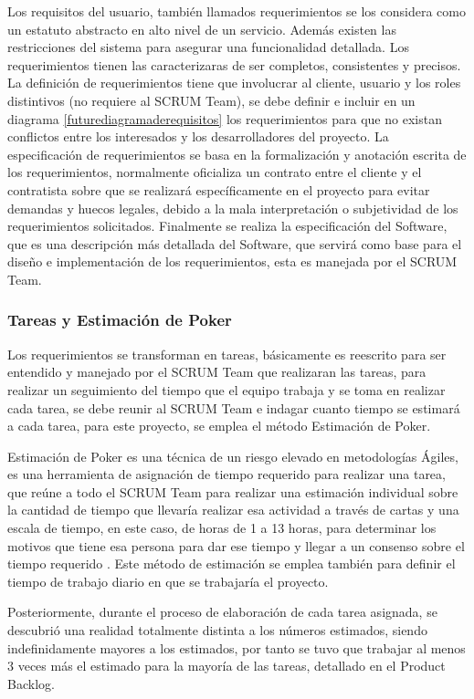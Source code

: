 Los requisitos del usuario, también llamados requerimientos se los considera como un estatuto abstracto en alto nivel de un servicio. Además existen las restricciones del sistema para asegurar una funcionalidad detallada. Los requerimientos tienen las caracterizaras de ser completos, consistentes y precisos. 
La definición de requerimientos tiene que involucrar al cliente, usuario y los roles distintivos (no requiere al SCRUM Team), se debe definir e incluir en un diagrama \ref{futurediagramaderequisitos} los requerimientos para que no existan conflictos entre los interesados y los desarrolladores del proyecto.
La especificación de requerimientos se basa en la formalización y anotación escrita de los requerimientos, normalmente oficializa un contrato entre el cliente y el contratista sobre que se realizará específicamente en el proyecto para evitar demandas y huecos legales, debido a la mala interpretación o subjetividad de los requerimientos solicitados.
Finalmente se realiza la especificación del Software, que es una descripción más detallada del Software, que servirá como base para el diseño e implementación de los requerimientos, esta es manejada por el SCRUM Team.

\subsubsection{Tareas y Estimación de Poker}

Los requerimientos se transforman en tareas, básicamente es reescrito para ser entendido y manejado por el SCRUM Team que realizaran las tareas, para realizar un seguimiento del tiempo que el equipo trabaja y se toma en realizar cada tarea, se debe reunir al SCRUM Team e indagar cuanto tiempo se estimará a cada tarea, para este proyecto, se emplea el método Estimación de Poker.

Estimación de Poker es una técnica de un riesgo elevado en metodologías Ágiles, es una herramienta de asignación de tiempo requerido para realizar una tarea, que reúne a todo el SCRUM Team para realizar una estimación individual sobre la cantidad de tiempo que llevaría realizar esa actividad a través de cartas y una escala de tiempo, en este caso, de horas de 1 a 13 horas, para determinar los motivos que tiene esa persona para dar ese tiempo y llegar a un consenso sobre el tiempo requerido \cite{scrumdiapo}. Este método de estimación se emplea también para definir el tiempo de trabajo diario en que se trabajaría el proyecto.

Posteriormente, durante el proceso de elaboración de cada tarea asignada, se descubrió una realidad totalmente distinta a los números estimados, siendo indefinidamente mayores a los estimados, por tanto se tuvo que trabajar al menos 3 veces más el estimado para la mayoría de las tareas, detallado en el Product Backlog.

